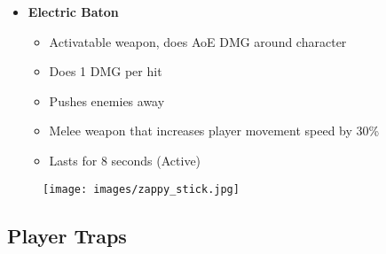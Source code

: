 \documentclass[10pt]{report}
\begin{document}
\begin{minipage}{.8\linewidth}
    \begin{itemize}
        \item \textbf{Electric Baton}
        \begin{itemize}
            \item Activatable weapon, does AoE DMG around character
            \item Does 1 DMG per hit
            \item Pushes enemies away
            \item Melee weapon that increases player movement speed by 30\%
            \item Lasts for 8 seconds (Active)
        \end{itemize}
    \end{itemize}
\end{minipage} \hfill
\begin{minipage}{.18\linewidth}
    \begin{figure}[H]
        \centering
        \texttt{[image: images/zappy\_stick.jpg]}
        \caption{}
    \end{figure}
\end{minipage}
    
\subsection{Player Traps}
\end{document}
